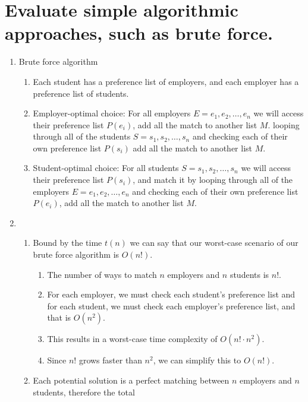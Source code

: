 \documentclass[12pt]{article}
\begin{document}
\section{Evaluate simple algorithmic approaches, such as brute force.}
   \begin{enumerate}
    \item Brute force algorithm
        \begin{enumerate}
            \item Each student has a preference list of employers, 
            and each employer has a preference list of students.
            \item Employer-optimal choice: For all employers $E = {e_1, e_2, \ldots, e_n}$ we will access their
            preference list $P(e_i)$, add all the match to another list $M$.
            looping through all of the students $S = {s_1, s_2, \ldots, s_n}$ and checking each of their own
            preference list $P(s_i)$ add all the match to another list $M$.
            \item Student-optimal choice: For all students $S = {s_1, s_2, \ldots, s_n}$ we will access their
            preference list $P(s_i)$, and match it by
            looping through all of the employers $E = {e_1, e_2, \ldots, e_n}$ and checking each of their own
            preference list $P(e_i)$, add all the match to another list $M$.
        \end{enumerate}
    \item 
        \begin{enumerate}
            \item Bound by the time $t(n)$ we can say that our worst-case scenario of our brute force algorithm is
            $O(n!)$.
                \begin{enumerate}[-]
                    \item The number of ways to match $n$ employers and $n$ students is $n!$.
                    \item For each employer, we must check each student's preference list and 
                    for each student, we must check each employer's preference list, and that is $O(n^2)$.
                    \item This results in a worst-case time complexity of $O(n! \cdot n^2)$.
                    \item Since $n$! grows faster than $n^2$, we can simplify this to $O(n!)$.
                \end{enumerate}
            \item Each potential solution is a perfect matching between $n$ employers and $n$ students, therefore the total

\end{enumerate}
\end{enumerate}
\end{document}
